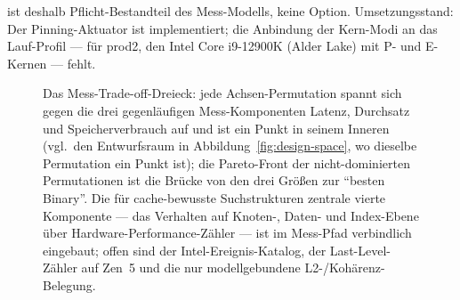 \begin{nurlang}
ist deshalb Pflicht-Bestandteil des Mess-Modells, keine Option. Umsetzungsstand: Der
Pinning-Aktuator ist implementiert; die Anbindung der Kern-Modi an das Lauf-Profil --- für prod2, den Intel
Core i9-12900K (Alder Lake) mit P- und E-Kernen --- fehlt.
\begin{figure}[htbp]\centering
{}
\caption{Das Mess-Trade-off-Dreieck: jede Achsen-Permutation spannt sich gegen die drei gegenläufigen
Mess-Komponenten Latenz, Durchsatz und Speicherverbrauch auf und ist ein Punkt in seinem Inneren (vgl.\ den
Entwurfsraum in Abbildung~\ref{fig:design-space}, wo dieselbe Permutation ein Punkt ist); die Pareto-Front
der nicht-dominierten Permutationen ist die Brücke von den drei Größen zur \enquote{besten Binary}. Die für
cache-bewusste Suchstrukturen zentrale vierte Komponente --- das Verhalten auf Knoten-, Daten- und
Index-Ebene über Hardware-Performance-Zähler --- ist im Mess-Pfad verbindlich eingebaut; offen sind der
Intel-Ereignis-Katalog, der Last-Level-Zähler auf Zen~5 und die nur modellgebundene L2-/Kohärenz-Belegung.}\label{fig:measurement-triangle}
\end{figure}

\end{nurlang}
